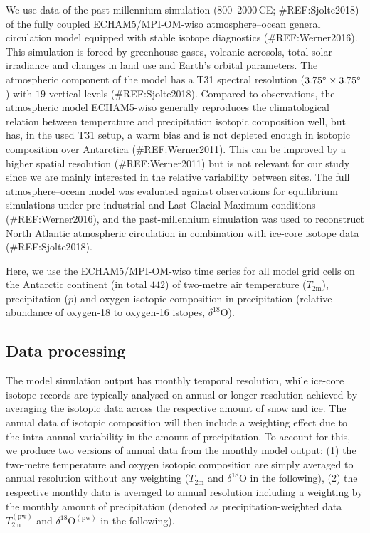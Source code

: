 \documentclass[cp, manuscript]{copernicus}
\begin{document}
We use data of the past-millennium simulation (800--2000\,CE; \#REF:Sjolte2018)
of the fully coupled ECHAM5/MPI-OM-wiso atmosphere--ocean general circulation
model equipped with stable isotope diagnostics (\#REF:Werner2016). This
simulation is forced by greenhouse gases, volcanic aerosols, total solar
irradiance and changes in land use and Earth's orbital parameters. The
atmospheric component of the model has a T31 spectral resolution
($3.75^{\circ}\times3.75^{\circ}$) with $19$ vertical levels
(\#REF:Sjolte2018). Compared to observations, the atmospheric model ECHAM5-wiso
generally reproduces the climatological relation between temperature and
precipitation isotopic composition well, but has, in the used T31 setup, a warm
bias and is not depleted enough in isotopic composition over Antarctica
(\#REF:Werner2011). This can be improved by a higher spatial resolution
(\#REF:Werner2011) but is not relevant for our study since we are mainly
interested in the relative variability between sites. The full atmosphere--ocean
model was evaluated against observations for equilibrium simulations under
pre-industrial and Last Glacial Maximum conditions (\#REF:Werner2016), and the
past-millennium simulation was used to reconstruct North Atlantic atmospheric
circulation in combination with ice-core isotope data (\#REF:Sjolte2018).

Here, we use the ECHAM5/MPI-OM-wiso time series for all model grid cells
on the Antarctic continent (in total $442$) of two-metre air temperature
($T_{2\mathrm{m}}$), precipitation ($p$) and oxygen isotopic composition in
precipitation (relative abundance of oxygen-18 to oxygen-16 istopes,
$\delta^{18}\mathrm{O}$).

\subsection{Data processing}\label{methods:prc}

The model simulation output has monthly temporal resolution, while ice-core
isotope records are typically analysed on annual or longer resolution achieved
by averaging the isotopic data across the respective amount of snow and
ice. The annual data of isotopic composition will then include a weighting
effect due to the intra-annual variability in the amount of precipitation. To
account for this, we produce two versions of annual data from the monthly model
output: (1) the two-metre temperature and oxygen isotopic composition are simply
averaged to annual resolution without any weighting ($T_{2\mathrm{m}}$ and
$\delta^{18}\mathrm{O}$ in the following), (2) the respective monthly data is
averaged to annual resolution including a weighting by the monthly amount of
precipitation (denoted as precipitation-weighted data
$T_{2\mathrm{m}}^{\mathrm{(pw)}}$ and $\delta^{18}\mathrm{O}^{\mathrm{(pw)}}$ in
the following).
\end{document}
